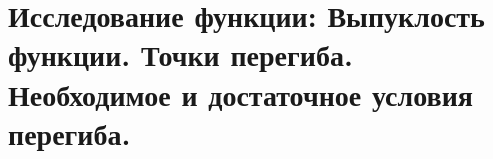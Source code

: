 \section{Исследование функции: Выпуклость функции. Точки перегиба. Необходимое и достаточное условия перегиба.}

\pagebreak
